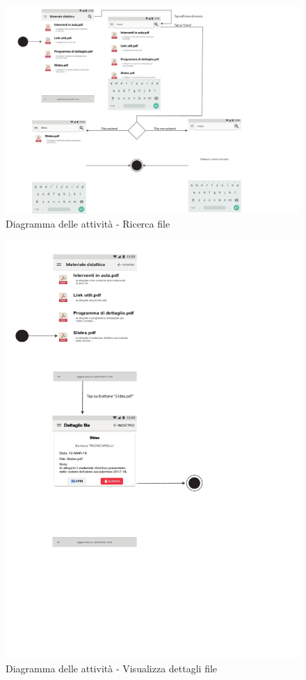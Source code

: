 \begin{figure}
	\centering
	\includegraphics[width=6in]{imgs/gruppo1/activity_diagrams/AD14_ricerca_file.pdf}
	\caption{Diagramma delle attività - Ricerca file}
	\label{diag:ricercaFileAD}
\end{figure}
\newpage

\begin{figure}
	\centering
	\includegraphics[width=6in]{imgs/gruppo1/activity_diagrams/AD15_dettagli_file.pdf}
	\caption{Diagramma delle attività - Visualizza dettagli file}
	\label{diag:visualizzaDettagliFileAD}
\end{figure}
\newpage

